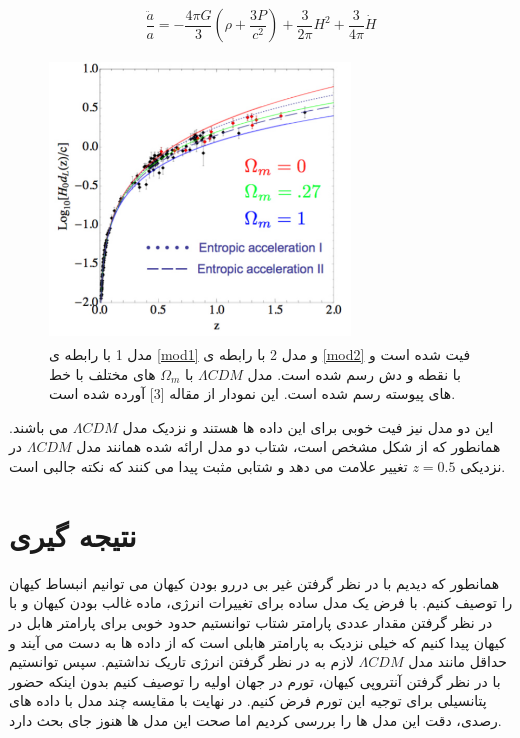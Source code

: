 \documentclass[12pt]{article}
\begin{document}
\begin{equation}\label{mod2}
\frac{\ddot a}{a}=-\frac{4\pi G}{3}(\rho + \frac{3P}{c^2})+\frac{3}{2\pi}H^2+\frac{3}{4\pi}\dot H
\end{equation}

\begin{figure}[H]
\centering
\includegraphics[width=8cm,height=7.5cm]{ax2.png}
\caption*{
مدل 1 با رابطه ی 
\eqref{mod1}
 و مدل 2 با رابطه ی 
\eqref{mod2}
 فیت شده است و با نقطه و دش رسم شده است. مدل $\Lambda CDM$ با $\Omega_m$ های مختلف با خط های پیوسته رسم شده است. این نمودار از مقاله [3] آورده شده است.
}
\end{figure}
این دو مدل نیز فیت خوبی برای این داده ها هستند و نزدیک مدل $\Lambda CDM$ می باشند. 
همانطور که از شکل مشخص است، شتاب دو مدل ارائه شده همانند مدل $\Lambda CDM$ در 
نزدیکی $z=0.5$ تغییر علامت می دهد و شتابی مثبت پیدا می کنند که نکته جالبی است.
\pagebreak
\section{نتیجه گیری}
همانطور که دیدیم با در نظر گرفتن غیر بی دررو بودن کیهان می توانیم انبساط کیهان را توصیف کنیم. با فرض یک مدل ساده برای تغییرات انرژی، ماده غالب بودن کیهان
و با در نظر گرفتن مقدار عددی پارامتر شتاب توانستیم حدود خوبی برای پارامتر هابل در کیهان پیدا کنیم که خیلی نزدیک به پارامتر هابلی است که از داده ها به دست می آیند و حداقل
مانند مدل $\Lambda CDM$ لازم به در نظر گرفتن انرژی تاریک نداشتیم.
سپس توانستیم با در نظر گرفتن آنتروپی کیهان، تورم در جهان اولیه را توصیف کنیم بدون اینکه حضور پتانسیلی برای توجیه این تورم فرض کنیم. در نهایت با مقایسه چند
مدل با داده های رصدی، دقت این مدل ها را بررسی کردیم اما صحت این مدل ها هنوز جای بحث دارد.
\end{document}

